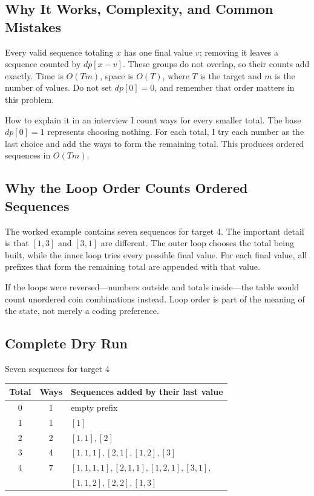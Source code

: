 \subsection{Why It Works, Complexity, and Common Mistakes}
Every valid sequence totaling \(x\) has one final value \(v\); removing it
leaves a sequence counted by \(dp[x-v]\). These groups do not overlap, so their
counts add exactly. Time is \(O(Tm)\), space is \(O(T)\), where \(T\) is the
target and \(m\) is the number of values. Do not set \(dp[0]=0\), and remember
that order matters in this problem.

\begin{revisionbox}{How to explain it in an interview}
I count ways for every smaller total. The base \(dp[0]=1\) represents choosing
nothing. For each total, I try each number as the last choice and add the ways
to form the remaining total. This produces ordered sequences in \(O(Tm)\).
\end{revisionbox}

\subsection{Why the Loop Order Counts Ordered Sequences}
The worked example contains seven sequences for target 4. The important detail is
that \([1,3]\) and \([3,1]\) are different. The outer loop chooses
the total being built, while the inner loop tries every possible final value.
For each final value, all prefixes that form the remaining total are appended
with that value.

If the loops were reversed---numbers outside and totals inside---the table
would count unordered coin combinations instead. Loop order is part of the
meaning of the state, not merely a coding preference.

\subsection{Complete Dry Run}
\begin{dryrunbox}{Seven sequences for target 4}
\begin{center}
\begin{tabular}{@{}c c l@{}}
\toprule
Total & Ways & Sequences added by their last value \\
\midrule
0 & 1 & empty prefix \\
1 & 1 & \([1]\) \\
2 & 2 & \([1,1],[2]\) \\
3 & 4 & \([1,1,1],[2,1],[1,2],[3]\) \\
4 & 7 & \([1,1,1,1],[2,1,1],[1,2,1],[3,1],\) \\
  &   & \([1,1,2],[2,2],[1,3]\) \\
\bottomrule
\end{tabular}
\end{center}
\end{dryrunbox}

